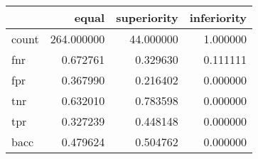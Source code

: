 \begin{tabular}{lrrr}
\toprule
{} &       equal &  superiority &  inferiority \\
\midrule
count &  264.000000 &    44.000000 &     1.000000 \\
fnr   &    0.672761 &     0.329630 &     0.111111 \\
fpr   &    0.367990 &     0.216402 &     0.000000 \\
tnr   &    0.632010 &     0.783598 &     0.000000 \\
tpr   &    0.327239 &     0.448148 &     0.000000 \\
bacc  &    0.479624 &     0.504762 &     0.000000 \\
\bottomrule
\end{tabular}
